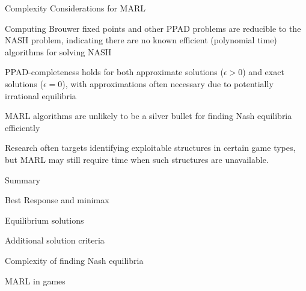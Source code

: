 \begin{frame}{Complexity Considerations for MARL}

\blist
    \item<1->  Computing Brouwer fixed points and other PPAD problems are reducible to the NASH problem, indicating there are no known efficient (polynomial time) algorithms for solving NASH
    
    \item<2->  PPAD-completeness holds for both approximate solutions (\(\epsilon > 0\)) and exact solutions (\(\epsilon = 0\)), with approximations often necessary due to potentially irrational equilibria
    
    \item<3->  MARL algorithms are unlikely to be a silver bullet for finding Nash equilibria efficiently
    
    \item<4->  Research often targets identifying exploitable structures in certain game types, but MARL may still require  time when such structures are unavailable.
\elist
    
\end{frame}

\begin{frame}{Summary}

    \blist
        \item Best Response and minimax
        \item Equilibrium solutions
        \item Additional solution criteria
        \item Complexity of finding Nash equilibria
    \elist


    \blist
        \item MARL in games
    \elist
    
\end{frame}



